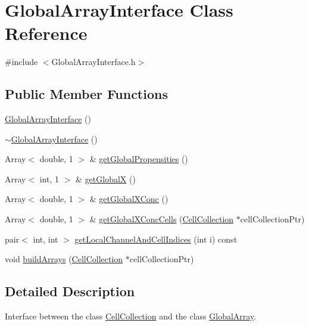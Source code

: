 \hypertarget{class_global_array_interface}{\section{\-Global\-Array\-Interface \-Class \-Reference}
\label{class_global_array_interface}
}


{\ttfamily \#include $<$\-Global\-Array\-Interface.\-h$>$}

\subsection*{\-Public \-Member \-Functions}
\begin{DoxyCompactItemize}
\item 
\hyperlink{class_global_array_interface_a589a4cc7bdab6ea93f2cccfd14852e83}{\-Global\-Array\-Interface} ()
\item 
\hyperlink{class_global_array_interface_a629b79ec48909de9e09aab2280984150}{$\sim$\-Global\-Array\-Interface} ()
\item 
\-Array$<$ double, 1 $>$ \& \hyperlink{class_global_array_interface_a9cd167cba6c9e01d30894733df307ce7}{get\-Global\-Propensities} ()
\item 
\-Array$<$ int, 1 $>$ \& \hyperlink{class_global_array_interface_a09be0527620a90ae720ae5cdc3d95571}{get\-Global\-X} ()
\item 
\-Array$<$ double, 1 $>$ \& \hyperlink{class_global_array_interface_abdca47cb52ecb68fdc84478d3c38ed95}{get\-Global\-X\-Conc} ()
\item 
\-Array$<$ double, 1 $>$ \& \hyperlink{class_global_array_interface_a1da06ec06a666357bddb1089b90a15f5}{get\-Global\-X\-Conc\-Cells} (\hyperlink{class_cell_collection}{\-Cell\-Collection} $\ast$cell\-Collection\-Ptr)
\item 
pair$<$ int, int $>$ \hyperlink{class_global_array_interface_af769d2c1204896ce4e232bcdd803c56f}{get\-Local\-Channel\-And\-Cell\-Indices} (int i) const 
\item 
void \hyperlink{class_global_array_interface_a5a20916202b280d821c5dfcec9ec59a4}{build\-Arrays} (\hyperlink{class_cell_collection}{\-Cell\-Collection} $\ast$cell\-Collection\-Ptr)
\end{DoxyCompactItemize}


\subsection{\-Detailed \-Description}
\-Interface between the class \hyperlink{class_cell_collection}{\-Cell\-Collection} and the class \hyperlink{class_global_array}{\-Global\-Array}.

